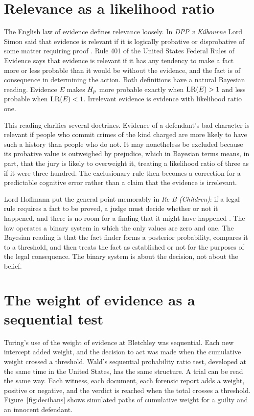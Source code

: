 \section{Relevance as a likelihood ratio}

The English law of evidence defines relevance loosely. In \emph{DPP v Kilbourne} Lord Simon said that evidence is relevant if it is logically probative or disprobative of some matter requiring proof \citep{kilbourne1973}. Rule 401 of the United States Federal Rules of Evidence says that evidence is relevant if it has any tendency to make a fact more or less probable than it would be without the evidence, and the fact is of consequence in determining the action. Both definitions have a natural Bayesian reading. Evidence $E$ makes $H_{p}$ more probable exactly when $\mathrm{LR}(E) > 1$ and less probable when $\mathrm{LR}(E) < 1$. Irrelevant evidence is evidence with likelihood ratio one.

This reading clarifies several doctrines. Evidence of a defendant's bad character is relevant if people who commit crimes of the kind charged are more likely to have such a history than people who do not. It may nonetheless be excluded because its probative value is outweighed by prejudice, which in Bayesian terms means, in part, that the jury is likely to overweight it, treating a likelihood ratio of three as if it were three hundred. The exclusionary rule then becomes a correction for a predictable cognitive error rather than a claim that the evidence is irrelevant.

Lord Hoffmann put the general point memorably in \emph{Re B (Children)}: if a legal rule requires a fact to be proved, a judge must decide whether or not it happened, and there is no room for a finding that it might have happened \citep{reb2008}. The law operates a binary system in which the only values are zero and one. The Bayesian reading is that the fact finder forms a posterior probability, compares it to a threshold, and then treats the fact as established or not for the purposes of the legal consequence. The binary system is about the decision, not about the belief.

\section{The weight of evidence as a sequential test}

Turing's use of the weight of evidence at Bletchley was sequential. Each new intercept added weight, and the decision to act was made when the cumulative weight crossed a threshold. Wald's sequential probability ratio test, developed at the same time in the United States, has the same structure. A trial can be read the same way. Each witness, each document, each forensic report adds a weight, positive or negative, and the verdict is reached when the total crosses a threshold. Figure~\ref{fig:decibans} shows simulated paths of cumulative weight for a guilty and an innocent defendant.

